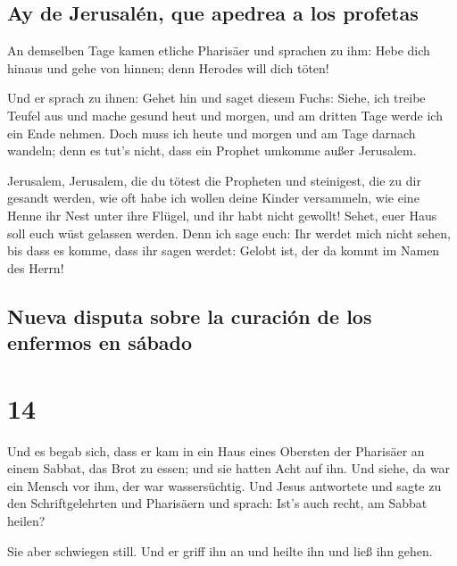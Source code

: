 \hypertarget{ay-de-jerusaluxe9n-que-apedrea-a-los-profetas}{%
\subsection{Ay de Jerusalén, que apedrea a los
profetas}\label{ay-de-jerusaluxe9n-que-apedrea-a-los-profetas}}

 An demselben Tage kamen etliche Pharisäer und sprachen
zu ihm: Hebe dich hinaus und gehe von hinnen; denn Herodes will dich
töten!

 Und er sprach zu ihnen: Gehet hin und saget diesem
Fuchs: Siehe, ich treibe Teufel aus und mache gesund heut und morgen,
und am dritten Tage werde ich ein Ende nehmen.  Doch muss
ich heute und morgen und am Tage darnach wandeln; denn es tut's nicht,
dass ein Prophet umkomme außer Jerusalem.

 Jerusalem, Jerusalem, die du tötest die Propheten und
steinigest, die zu dir gesandt werden, wie oft habe ich wollen deine
Kinder versammeln, wie eine Henne ihr Nest unter ihre Flügel, und ihr
habt nicht gewollt!  Sehet, euer Haus soll euch wüst
gelassen werden. Denn ich sage euch: Ihr werdet mich nicht sehen, bis
dass es komme, dass ihr sagen werdet: Gelobt ist, der da kommt im Namen
des Herrn!

\hypertarget{nueva-disputa-sobre-la-curaciuxf3n-de-los-enfermos-en-suxe1bado}{%
\subsection{Nueva disputa sobre la curación de los enfermos en
sábado}\label{nueva-disputa-sobre-la-curaciuxf3n-de-los-enfermos-en-suxe1bado}}

\hypertarget{section-13}{%
\section{14}\label{section-13}}

 Und es begab sich, dass er kam in ein Haus eines Obersten
der Pharisäer an einem Sabbat, das Brot zu essen; und sie hatten Acht
auf ihn.  Und siehe, da war ein Mensch vor ihm, der war
wassersüchtig.  Und Jesus antwortete und sagte zu den
Schriftgelehrten und Pharisäern und sprach: Ist's auch recht, am Sabbat
heilen?

 Sie aber schwiegen still. Und er griff ihn an und heilte
ihn und ließ ihn gehen.

